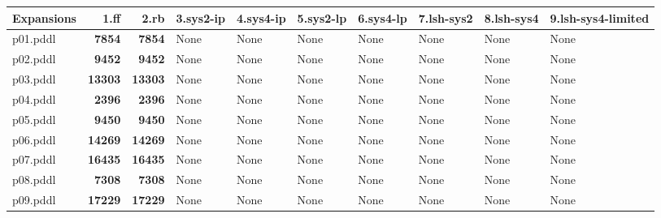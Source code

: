 \documentclass{article}
\begin{document}
\begin{tabular}{@{}lrrrrrrrrr@{}}
Expansions & 1.ff & 2.rb & 3.sys2-ip & 4.sys4-ip & 5.sys2-lp & 6.sys4-lp & 7.lsh-sys2 & 8.lsh-sys4 & 9.lsh-sys4-limited \\
\midrule
p01.pddl & \textbf{7854} & \textbf{7854} & \multicolumn{1}{|l|}{None} & \multicolumn{1}{|l|}{None} & \multicolumn{1}{|l|}{None} & \multicolumn{1}{|l|}{None} & \multicolumn{1}{|l|}{None} & \multicolumn{1}{|l|}{None} & \multicolumn{1}{|l|}{None} \\
p02.pddl & \textbf{9452} & \textbf{9452} & \multicolumn{1}{|l|}{None} & \multicolumn{1}{|l|}{None} & \multicolumn{1}{|l|}{None} & \multicolumn{1}{|l|}{None} & \multicolumn{1}{|l|}{None} & \multicolumn{1}{|l|}{None} & \multicolumn{1}{|l|}{None} \\
p03.pddl & \textbf{13303} & \textbf{13303} & \multicolumn{1}{|l|}{None} & \multicolumn{1}{|l|}{None} & \multicolumn{1}{|l|}{None} & \multicolumn{1}{|l|}{None} & \multicolumn{1}{|l|}{None} & \multicolumn{1}{|l|}{None} & \multicolumn{1}{|l|}{None} \\
p04.pddl & \textbf{2396} & \textbf{2396} & \multicolumn{1}{|l|}{None} & \multicolumn{1}{|l|}{None} & \multicolumn{1}{|l|}{None} & \multicolumn{1}{|l|}{None} & \multicolumn{1}{|l|}{None} & \multicolumn{1}{|l|}{None} & \multicolumn{1}{|l|}{None} \\
p05.pddl & \textbf{9450} & \textbf{9450} & \multicolumn{1}{|l|}{None} & \multicolumn{1}{|l|}{None} & \multicolumn{1}{|l|}{None} & \multicolumn{1}{|l|}{None} & \multicolumn{1}{|l|}{None} & \multicolumn{1}{|l|}{None} & \multicolumn{1}{|l|}{None} \\
p06.pddl & \textbf{14269} & \textbf{14269} & \multicolumn{1}{|l|}{None} & \multicolumn{1}{|l|}{None} & \multicolumn{1}{|l|}{None} & \multicolumn{1}{|l|}{None} & \multicolumn{1}{|l|}{None} & \multicolumn{1}{|l|}{None} & \multicolumn{1}{|l|}{None} \\
p07.pddl & \textbf{16435} & \textbf{16435} & \multicolumn{1}{|l|}{None} & \multicolumn{1}{|l|}{None} & \multicolumn{1}{|l|}{None} & \multicolumn{1}{|l|}{None} & \multicolumn{1}{|l|}{None} & \multicolumn{1}{|l|}{None} & \multicolumn{1}{|l|}{None} \\
p08.pddl & \textbf{7308} & \textbf{7308} & \multicolumn{1}{|l|}{None} & \multicolumn{1}{|l|}{None} & \multicolumn{1}{|l|}{None} & \multicolumn{1}{|l|}{None} & \multicolumn{1}{|l|}{None} & \multicolumn{1}{|l|}{None} & \multicolumn{1}{|l|}{None} \\
p09.pddl & \textbf{17229} & \textbf{17229} & \multicolumn{1}{|l|}{None} & \multicolumn{1}{|l|}{None} & \multicolumn{1}{|l|}{None} & \multicolumn{1}{|l|}{None} & \multicolumn{1}{|l|}{None} & \multicolumn{1}{|l|}{None} & \multicolumn{1}{|l|}{None} \\

\end{tabular}
\end{document}
